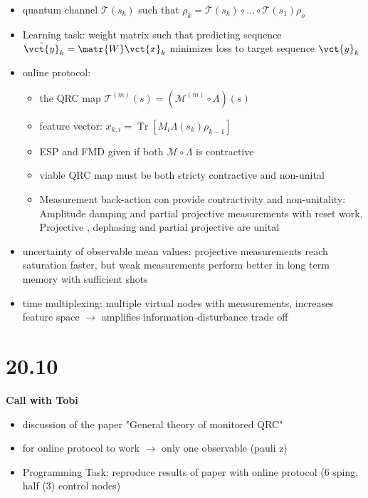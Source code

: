 \begin{itemize}
\begin{enumerate}
        coupling unitary - $U_{PS} = CNOT_{S,P}(RY(\theta)_P \otimes I_S)$ 
        \item Amplitude damping measurement map \\
        coupling unitary - $U_{PS} = CNOT_{S,P}CRY(\theta)_{S,P}$ \\
        (controlled Y rotation)
        \item Partial measurement map: \\
        assign some of the units of a large system the role of the proble \\
        $\Omega_{\vct{b}_m}^{PM} = \Omega_{b_1} \otimes ... \otimes \Omega_{b_n} \otimes I^{\otimes (N-N_P)}$
    \end{enumerate}
    \item quantum channel $\mathcal{T}(s_k)$ such that $\rho_k = \mathcal{T}(s_k) \circ ... \circ \mathcal{T}(s_{1}) \rho_o$
    \item Learning task: weight matrix such that predicting sequence $\hat{\vct{y}}_k = \matr{W} \vct{x}_k$ minimizes loss to target sequence $\vct{y}_k$
    \item online protocol:
    \begin{itemize}
        \item the QRC map $\mathcal{T}^{(m)}(s) = (\mathcal{M}^{(m)}\circ \Lambda) (s)$
        \item feature vector: $x_{k,i} = \operatorname{Tr}[M_i\Lambda(s_k)\rho_{k-1}]$
        \item ESP and FMD given if both $\mathcal{M} \circ \Lambda$ is contractive 
        \item viable QRC map must be both stricty contractive and non-unital
        \item Measurement back-action con provide contractivity and non-unitality: \\
        Amplitude damping and partial projective measurements with reset work, Projective , dephasing and partial projective are unital 
    \end{itemize}
    \item uncertainty of observable mean values: projective measurements reach saturation faster, but weak measurements perform better in long term memory with sufficient shots
    \item time multiplexing: multiple virtual nodes with measurements, increases feature space $\to$ amplifies information-disturbance trade off
\end{itemize}


\section*{20.10}
\textbf{Call with Tobi}
\begin{itemize}
    \item discussion of the paper "General theory of monitored QRC"
    \item for online protocol to work $\to$ only one observable (pauli z)
    \item Programming Task: reproduce results of paper with online protocol (6 sping, half (3) control nodes)
\end{itemize}

